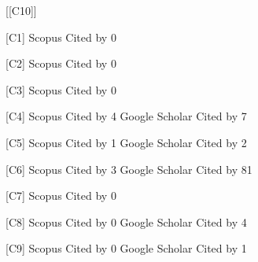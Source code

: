 \begin{labeling}{[{[}C10{]}]} 
\item [{[}C1{]}]  	Scopus Cited by 0
\item [{[}C2{]}]  	Scopus Cited by 0
\item [{[}C3{]}]    Scopus Cited by 0
\item [{[}C4{]}]  	Scopus Cited by 4 Google Scholar Cited by 7
\item [{[}C5{]}]  	Scopus Cited by 1  Google Scholar Cited by 2
\item [{[}C6{]}]  	Scopus Cited by 3  Google Scholar Cited by 81
\item [{[}C7{]}]	Scopus Cited by 0
\item [{[}C8{]}]	Scopus Cited by 0  Google Scholar Cited by 4
\item [{[}C9{]}]	Scopus Cited by 0  Google Scholar Cited by 1
\end{labeling}







